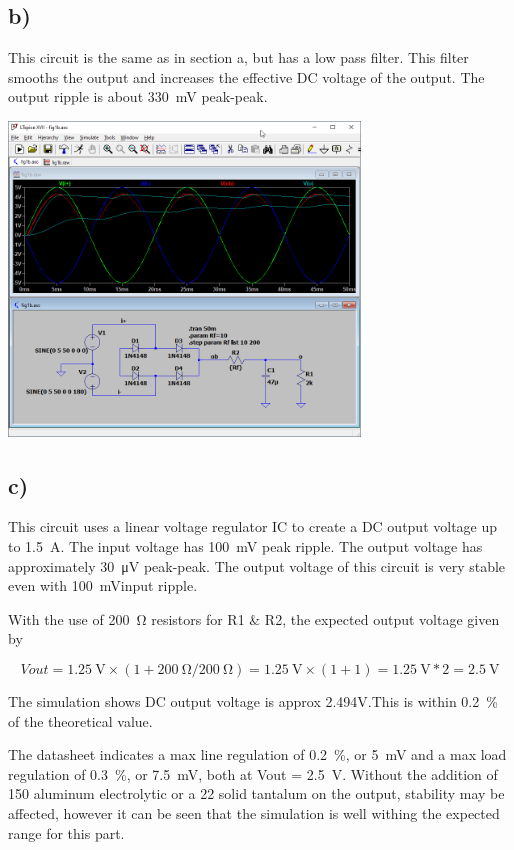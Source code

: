 \documentclass{article}
\begin{document}
	\subsection*{b)}

	This circuit is the same as in section a, but has a low pass filter. This filter smooths the output and increases the effective DC voltage of the output. The output ripple is about \SI{330}{\mV} peak-peak.
	
	\begin{center}
	\includegraphics[width=0.7\textwidth]{fig1b}
	\end{center}
	
	\subsection*{c)}
	
	This circuit uses a linear voltage regulator IC to create a DC output voltage up to \SI{1.5}{\ampere}. The input voltage has \SI{100}{\mV} peak ripple. The output voltage has approximately \SI{30}{\uV} peak-peak. The output voltage of this circuit is very stable even with \SI{100}{\mV}input ripple.

	With the use of \SI{200}{\ohm} resistors for R1 \& R2, the expected output voltage given by 
	
	$$Vout = \SI{1.25}{\volt} × (1 + \SI{200}{\ohm} / \SI{200}{\ohm}) = \SI{1.25}{\volt} × (1 + 1) = \SI{1.25}{\volt} * 2 = \SI{2.5}{\volt}$$
		
	The simulation shows DC output voltage is approx 2.494V.This is within \SI{0.2}{\percent} of the theoretical value. 
	
	The datasheet indicates a max line regulation of \SI{0.2}{\percent}, or \SI{5}{\mV} and a max load regulation of \SI{0.3}{\percent}, or \SI{7.5}{\mV}, both at Vout = \SI{2.5}{\V}. Without the addition of \SI{150}{\uF} aluminum electrolytic or a \SI{22}{\uF} solid tantalum on the output, stability may be affected, however it can be seen that the simulation is well withing the expected range for this part.
	
\end{document}
